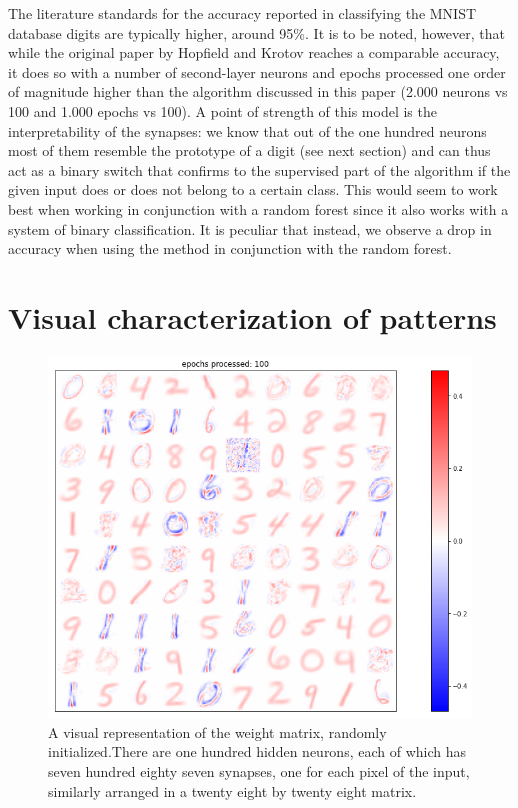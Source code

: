 \documentclass[a4paper]{report}
\begin{document}
The literature standards for the accuracy reported in classifying the MNIST database digits are typically higher, around 95\%.
It is to be noted, however, that while the original paper by Hopfield and Krotov reaches a comparable accuracy, it does so with a number of second-layer neurons and epochs processed one order of magnitude higher than the algorithm discussed in this paper (2.000 neurons vs 100 and 1.000 epochs vs 100).
A point of strength of this model is the interpretability of the synapses:
we know that out of the one hundred neurons most of them resemble the prototype of a digit (see next section) and can thus act as a binary switch that confirms to the supervised part of the algorithm if the given input does or does not belong to a certain class.
This would seem to work best when working in conjunction with a random forest since it also works with a system of binary classification.
It is peculiar that instead, we observe a drop in accuracy when using the method in conjunction with the random forest.

\section{Visual characterization of patterns}


\begin{figure} [H]
    \centering
    \includegraphics [width=12cm ] {h/uu_heatmap.png}
    \caption{A visual representation of the weight matrix, randomly initialized.There are one hundred hidden neurons, each of which has seven hundred eighty seven synapses, one for each pixel of the input, similarly arranged in a twenty eight by twenty eight matrix.}
    \label{heatmap}
\end{figure}
\end{document}
